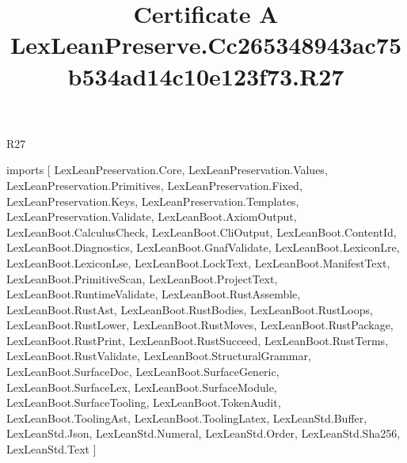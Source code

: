 \begin{lexlean}{R27}
\title{Certificate A LexLeanPreserve.Cc265348943ac75b534ad14c10e123f73.R27}
\begin{coremodule}
imports [
  LexLeanPreservation.Core,
  LexLeanPreservation.Values,
  LexLeanPreservation.Primitives,
  LexLeanPreservation.Fixed,
  LexLeanPreservation.Keys,
  LexLeanPreservation.Templates,
  LexLeanPreservation.Validate,
  LexLeanBoot.AxiomOutput,
  LexLeanBoot.CalculusCheck,
  LexLeanBoot.CliOutput,
  LexLeanBoot.ContentId,
  LexLeanBoot.Diagnostics,
  LexLeanBoot.GnafValidate,
  LexLeanBoot.LexiconLre,
  LexLeanBoot.LexiconLse,
  LexLeanBoot.LockText,
  LexLeanBoot.ManifestText,
  LexLeanBoot.PrimitiveScan,
  LexLeanBoot.ProjectText,
  LexLeanBoot.RuntimeValidate,
  LexLeanBoot.RustAssemble,
  LexLeanBoot.RustAst,
  LexLeanBoot.RustBodies,
  LexLeanBoot.RustLoops,
  LexLeanBoot.RustLower,
  LexLeanBoot.RustMoves,
  LexLeanBoot.RustPackage,
  LexLeanBoot.RustPrint,
  LexLeanBoot.RustSucceed,
  LexLeanBoot.RustTerms,
  LexLeanBoot.RustValidate,
  LexLeanBoot.StructuralGrammar,
  LexLeanBoot.SurfaceDoc,
  LexLeanBoot.SurfaceGeneric,
  LexLeanBoot.SurfaceLex,
  LexLeanBoot.SurfaceModule,
  LexLeanBoot.SurfaceTooling,
  LexLeanBoot.TokenAudit,
  LexLeanBoot.ToolingAst,
  LexLeanBoot.ToolingLatex,
  LexLeanStd.Buffer,
  LexLeanStd.Json,
  LexLeanStd.Numeral,
  LexLeanStd.Order,
  LexLeanStd.Sha256,
  LexLeanStd.Text
]


\end{coremodule}
\end{lexlean}
